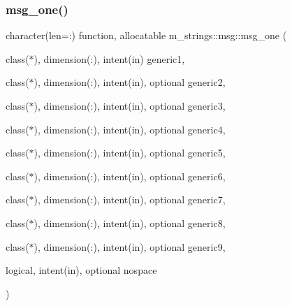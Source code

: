 \subsubsection{\texorpdfstring{msg\+\_\+one()}{msg\_one()}}
{\footnotesize\ttfamily character(len=\+:) function, allocatable m\+\_\+strings\+::msg\+::msg\+\_\+one (\begin{DoxyParamCaption}\item[{class($\ast$), dimension(\+:), intent(in)}]{generic1,  }\item[{class($\ast$), dimension(\+:), intent(in), optional}]{generic2,  }\item[{class($\ast$), dimension(\+:), intent(in), optional}]{generic3,  }\item[{class($\ast$), dimension(\+:), intent(in), optional}]{generic4,  }\item[{class($\ast$), dimension(\+:), intent(in), optional}]{generic5,  }\item[{class($\ast$), dimension(\+:), intent(in), optional}]{generic6,  }\item[{class($\ast$), dimension(\+:), intent(in), optional}]{generic7,  }\item[{class($\ast$), dimension(\+:), intent(in), optional}]{generic8,  }\item[{class($\ast$), dimension(\+:), intent(in), optional}]{generic9,  }\item[{logical, intent(in), optional}]{nospace }\end{DoxyParamCaption})\hspace{0.3cm}{\ttfamily [private]}}

\mbox{\label{interfacem__strings_1_1msg_a087c0599aee7792fc0c49bd42ee4813c}} 
